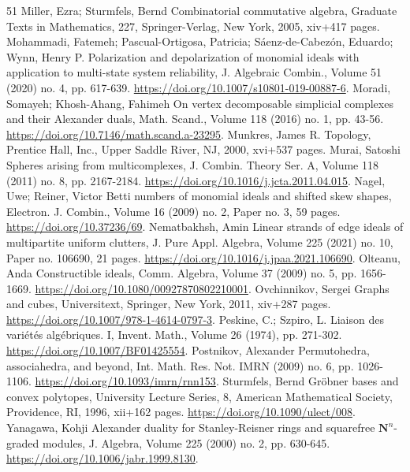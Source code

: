 \documentclass[10pt,a4paper]{article}
\theoremstyle{definition}
\theoremstyle{remark}
\theoremstyle{plain}
\begin{document}
\begin{thebibliography}{51}
 Miller, Ezra; Sturmfels, Bernd Combinatorial commutative algebra, Graduate Texts in Mathematics, 227, Springer-Verlag, New York, 2005, xiv+417 pages.
 Mohammadi, Fatemeh; Pascual-Ortigosa, Patricia; Sáenz-de-Cabezón, Eduardo; Wynn, Henry P. Polarization and depolarization of monomial ideals with application to multi-state system reliability, J. Algebraic Combin., Volume 51 (2020) no. 4, pp. 617-639. \url{https://doi.org/10.1007/s10801-019-00887-6}.
 Moradi, Somayeh; Khosh-Ahang, Fahimeh On vertex decomposable simplicial complexes and their Alexander duals, Math. Scand., Volume 118 (2016) no. 1, pp. 43-56. \url{https://doi.org/10.7146/math.scand.a-23295}.
 Munkres, James R. Topology, Prentice Hall, Inc., Upper Saddle River, NJ, 2000, xvi+537 pages.
 Murai, Satoshi Spheres arising from multicomplexes, J. Combin. Theory Ser. A, Volume 118 (2011) no. 8, pp. 2167-2184. \url{https://doi.org/10.1016/j.jcta.2011.04.015}.
 Nagel, Uwe; Reiner, Victor Betti numbers of monomial ideals and shifted skew shapes, Electron. J. Combin., Volume 16 (2009) no. 2, Paper no. 3, 59 pages. \url{https://doi.org/10.37236/69}.
 Nematbakhsh, Amin Linear strands of edge ideals of multipartite uniform clutters, J. Pure Appl. Algebra, Volume 225 (2021) no. 10, Paper no. 106690, 21 pages. \url{https://doi.org/10.1016/j.jpaa.2021.106690}.
 Olteanu, Anda Constructible ideals, Comm. Algebra, Volume 37 (2009) no. 5, pp. 1656-1669. \url{https://doi.org/10.1080/00927870802210001}.
 Ovchinnikov, Sergei Graphs and cubes, Universitext, Springer, New York, 2011, xiv+287 pages. \url{https://doi.org/10.1007/978-1-4614-0797-3}.
 Peskine, C.; Szpiro, L. Liaison des variétés algébriques. I, Invent. Math., Volume 26 (1974), pp. 271-302. \url{https://doi.org/10.1007/BF01425554}.
 Postnikov, Alexander Permutohedra, associahedra, and beyond, Int. Math. Res. Not. IMRN (2009) no. 6, pp. 1026-1106. \url{https://doi.org/10.1093/imrn/rnn153}.
 Sturmfels, Bernd Gröbner bases and convex polytopes, University Lecture Series, 8, American Mathematical Society, Providence, RI, 1996, xii+162 pages. \url{https://doi.org/10.1090/ulect/008}.
 Yanagawa, Kohji Alexander duality for Stanley-Reisner rings and squarefree $\mathbf{N}^n$-graded modules, J. Algebra, Volume 225 (2000) no. 2, pp. 630-645. \url{https://doi.org/10.1006/jabr.1999.8130}.
\end{thebibliography}
\end{document}
